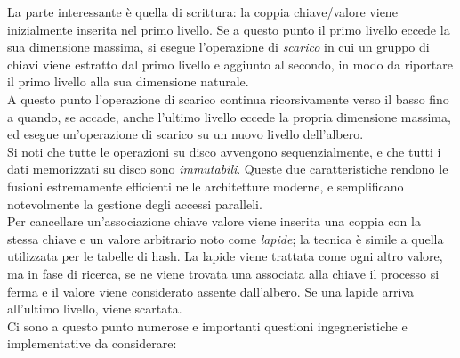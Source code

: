 La parte interessante è quella di scrittura: la coppia chiave/valore viene inizialmente inserita nel primo livello. Se a questo punto il primo livello eccede la sua dimensione massima, si esegue l'operazione di \textit{scarico} in cui un gruppo di chiavi viene estratto dal primo livello e aggiunto al secondo, in modo da riportare il primo livello alla sua dimensione naturale.\\
A questo punto l'operazione di scarico continua ricorsivamente verso il basso fino a quando, se accade, anche l'ultimo livello eccede la propria dimensione massima, ed esegue un'operazione di scarico su un nuovo livello dell'albero.\\
Si noti che tutte le operazioni su disco avvengono sequenzialmente, e che tutti i dati memorizzati su disco sono \textit{immutabili}. Queste due caratteristiche rendono le fusioni estremamente efficienti nelle architetture moderne, e semplificano notevolmente la gestione degli accessi paralleli.\\
Per cancellare un'associazione chiave valore viene inserita una coppia con la stessa chiave e un valore arbitrario noto come \textit{lapide}; la tecnica è simile a quella utilizzata per le tabelle di hash. La lapide viene trattata come ogni altro valore, ma in fase di ricerca, se ne viene trovata una associata alla chiave il processo si ferma e il valore viene considerato assente dall'albero. Se una lapide arriva all'ultimo livello, viene scartata.\\
Ci sono a questo punto numerose e importanti questioni ingegneristiche e implementative da considerare:
